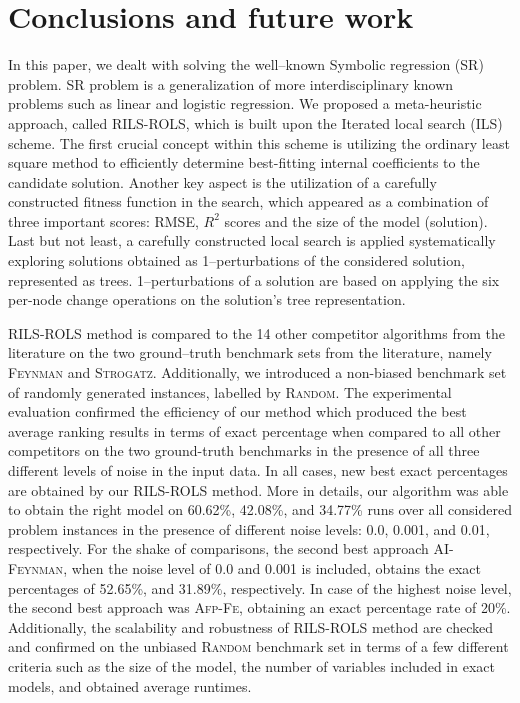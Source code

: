 \documentclass{bmcart}
\begin{document}
\section{Conclusions and future work}\label{sec:conclusions}

In this paper, we dealt with solving the well--known Symbolic regression (SR)  problem. SR problem is a generalization of more interdisciplinary known problems such as linear and logistic regression.    
We proposed a meta-heuristic approach, called \textsc{RILS}-\textsc{ROLS}, which is built upon the Iterated local search (ILS) scheme. The first crucial concept within this scheme is utilizing the ordinary least square method to efficiently determine best-fitting internal coefficients to the candidate solution. %
Another key aspect is the utilization of a carefully constructed fitness function in the search, which appeared as a combination of three important scores: RMSE, $R^2$  scores and the size of the model (solution).  Last but not least, a carefully constructed local search is applied systematically exploring solutions obtained as 1--perturbations of the considered solution, represented as trees.  1--perturbations of a solution are based on applying the six per-node change operations on the solution's tree representation. 

\textsc{RILS-ROLS} method is compared to the 14 other competitor algorithms from the literature on the two ground--truth benchmark sets from the literature, namely \textsc{Feynman} and \textsc{Strogatz}.  Additionally, we introduced a non-biased benchmark set of randomly generated instances, labelled by \textsc{Random}.  The experimental evaluation confirmed the efficiency of our method which produced the best average ranking results in terms of exact percentage when compared to all other competitors on the two ground-truth benchmarks in the presence of all three different levels of noise in the input data. In all cases, new best exact percentages are obtained by our \textsc{RILS-ROLS} method.   More in details,
our algorithm was able to obtain the right model on 60.62\%, 42.08\%, and 34.77\% runs over all considered problem instances in the presence of different noise levels: 0.0, 0.001, and 0.01, respectively. For the shake of comparisons, the second best approach \textsc{AI-Feynman}, when the noise level of 0.0 and 0.001 is included, obtains the exact percentages of 52.65\%, and 31.89\%, respectively. In case of the highest noise level, the second best approach was \textsc{Afp-Fe}, obtaining an exact percentage rate of 20\%. Additionally, the scalability and robustness of \textsc{RILS}-\textsc{ROLS} method are checked and confirmed on the unbiased \textsc{Random} benchmark set in terms of a few different criteria such as the size of the model, the number of variables included in exact models, and obtained average runtimes. 
\end{document}
